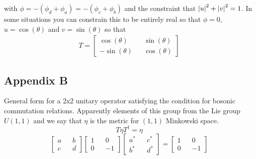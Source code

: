 \documentclass[12pt]{article}
\begin{document}
with $\phi = -(\phi_d+\phi_a)=-(\phi_c+\phi_b)$ and the constraint that $\abs{u}^2 + \abs{v}^2 = 1$. In some situations you can constrain this to be entirely real so that $\phi=0$, $u=\cos(\theta)$ and $v = \sin(\theta)$ so that
\begin{align}
T=\begin{bmatrix}
\cos(\theta) && \sin(\theta)\\
-\sin(\theta) && \cos(\theta)
\end{bmatrix}
\end{align}

\subsection{Appendix B}%
General form for a 2x2 unitary operator satisfying the condition for bosonic commutation relations. Apparently elements of this group from the Lie group $U(1,1)$ and we say that $\eta$ is the metric for $(1,1)$ Minkowski space.
\begin{equation}
T\eta T^{\dag} = \eta
\end{equation}
\begin{equation}
\begin{bmatrix}
a && b\\
c && d
\end{bmatrix}
\begin{bmatrix}
1 && 0\\
0 && -1
\end{bmatrix}
\begin{bmatrix}
a^* && c^*\\
b^* && d^*
\end{bmatrix}=
\begin{bmatrix}
1 && 0\\
0 && -1
\end{bmatrix}
\end{equation}
\end{document}

